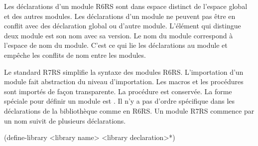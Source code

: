 Les déclarations d'un module R6RS sont dans espace distinct de l'espace global et
des autres modules. Les déclarations d'un module ne peuvent pas être en conflit avec
des déclaration global ou d'autre module. L'élément qui distingue deux module est
son nom avec sa version. Le nom du module correspond à l'espace de nom du module.
C'est ce qui lie les déclarations au module et empêche les conflits de nom entre
les modules.







Le standard R7RS\cite{Scheme:R7RS} simplifie la syntaxe des modules
R6RS\cite{Scheme:R6RS}.  L'importation d'un module fait abstraction du niveau
d'importation. Les macros et les procédures sont importés de façon
transparente. La procédure  est conservée. La forme spéciale pour
définir un module est . Il n'y a pas d'ordre spécifique
dans les déclarations de la bibliothèque comme en R6RS. Un module R7RS commence par
un nom suivit de plusieurs déclarations.\\
\begin{center}
  \begin{mplisting}{0.5}
(define-library <library name>
  <library declaration>*)
\end{mplisting}
\end{center}

